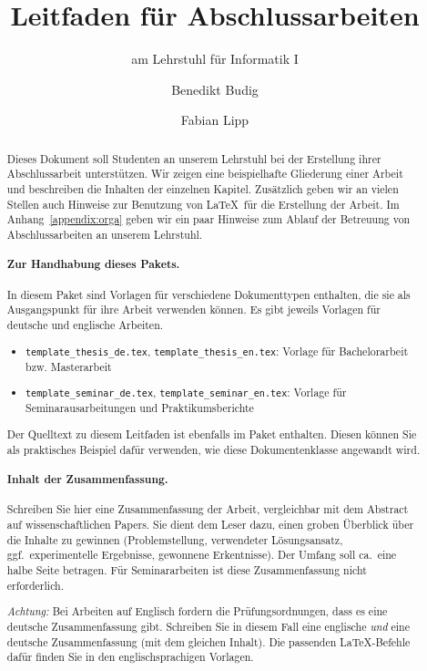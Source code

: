 \documentclass[bachelor,german]{info1thesis}
\title{Leitfaden für Abschlussarbeiten} %
\subtitle{am Lehrstuhl für Informatik I}
\author{Benedikt Budig\and Fabian Lipp} %
\begin{document}

\begin{abstract}
    Dieses Dokument soll Studenten an unserem Lehrstuhl bei der Erstellung
    ihrer Abschlussarbeit unterstützen.
    Wir zeigen eine beispielhafte Gliederung einer Arbeit und beschreiben
    die Inhalten der einzelnen Kapitel.
    Zusätzlich geben wir an vielen Stellen auch Hinweise zur Benutzung von
    \LaTeX\ für die Erstellung der Arbeit.
    Im Anhang~\ref{appendix:orga} geben wir ein paar Hinweise zum Ablauf der
    Betreuung von Abschlussarbeiten an unserem Lehrstuhl.

    \paragraph{Zur Handhabung dieses Pakets.}
    In diesem Paket sind Vorlagen für verschiedene Dokumenttypen enthalten, die
    sie als Ausgangspunkt für ihre Arbeit verwenden können.
    Es gibt jeweils Vorlagen für deutsche und englische Arbeiten.
    \begin{itemize}
        \item \verb+template_thesis_de.tex+, \verb+template_thesis_en.tex+:
            Vorlage für Bachelorarbeit bzw. Masterarbeit
        \item \verb+template_seminar_de.tex+, \verb+template_seminar_en.tex+:
            Vorlage für Seminarausarbeitungen und Praktikumsberichte
    \end{itemize}
    Der Quelltext zu diesem Leitfaden ist ebenfalls im Paket enthalten.
    Diesen können Sie als praktisches Beispiel dafür verwenden, wie diese
    Dokumentenklasse angewandt wird.

    \paragraph{Inhalt der Zusammenfassung.}
    Schreiben Sie hier eine Zusammenfassung der Arbeit, vergleichbar mit dem Abstract auf wissenschaftlichen Papers.
    Sie dient dem Leser dazu, einen groben Überblick über die Inhalte zu gewinnen (Problemstellung, verwendeter Lösungsansatz, ggf.\ experimentelle Ergebnisse, gewonnene Erkentnisse).
    Der Umfang soll ca.\ eine halbe Seite betragen.
    Für Seminararbeiten ist diese Zusammenfassung nicht erforderlich.
    
    \emph{Achtung:} Bei Arbeiten auf Englisch fordern die
    Prüfungsordnungen, dass es eine deutsche Zusammenfassung gibt.
    Schreiben Sie in diesem Fall eine englische \emph{und} eine deutsche Zusammenfassung (mit dem gleichen Inhalt).
    Die passenden \LaTeX-Befehle dafür finden Sie in den englischsprachigen
    Vorlagen.


\end{abstract}
\end{document}
